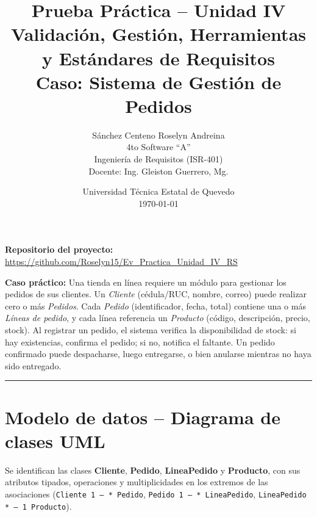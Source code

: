 \documentclass[11pt,a4paper]{article}
\title{\textbf{Prueba Práctica -- Unidad IV}\\[0.3em]
\large Validación, Gestión, Herramientas y Estándares de Requisitos\\[0.3em]
\normalsize Caso: Sistema de Gestión de Pedidos}
\author{Sánchez Centeno Roselyn Andreina \\ 4to Software ``A'' \\ Ingeniería de Requisitos (ISR-401) \\ Docente: Ing. Gleiston Guerrero, Mg.}
\date{Universidad Técnica Estatal de Quevedo \\ \today}
\begin{document}
\maketitle

\noindent\textbf{Repositorio del proyecto:} \url{https://github.com/Roselyn15/Ev_Practica_Unidad_IV_RS}

\vspace{1em}
\noindent\textbf{Caso práctico:} Una tienda en línea requiere un módulo para gestionar los pedidos
de sus clientes. Un \emph{Cliente} (cédula/RUC, nombre, correo) puede realizar cero o más \emph{Pedidos}.
Cada \emph{Pedido} (identificador, fecha, total) contiene una o más \emph{Líneas de pedido}, y cada línea
referencia un \emph{Producto} (código, descripción, precio, stock). Al registrar un pedido, el sistema
verifica la disponibilidad de stock: si hay existencias, confirma el pedido; si no, notifica el faltante.
Un pedido confirmado puede despacharse, luego entregarse, o bien anularse mientras no haya sido entregado.

\vspace{1em}
\hrule
\vspace{1em}

\section{Modelo de datos -- Diagrama de clases UML}

Se identifican las clases \textbf{Cliente}, \textbf{Pedido}, \textbf{LineaPedido} y \textbf{Producto},
con sus atributos tipados, operaciones y multiplicidades en los extremos de las asociaciones
(\texttt{Cliente 1 -- * Pedido}, \texttt{Pedido 1 -- * LineaPedido}, \texttt{LineaPedido * -- 1 Producto}).
\end{document}
